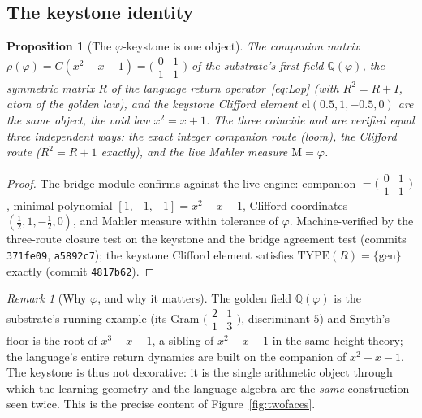 \documentclass[11pt]{article}
\theoremstyle{plain}
\newtheorem{proposition}[theorem]{Proposition}
\theoremstyle{definition}
\theoremstyle{remark}
\newtheorem{remark}[theorem]{Remark}
\newcommand{\Q}{\mathbb{Q}}
\newcommand{\Mah}{\mathrm{M}}
\begin{document}
\subsection{The keystone identity}
\begin{proposition}[The $\varphi$-keystone is one object]\label{prop:keystone}
The companion matrix $\rho(\varphi)=C(x^2-x-1)=\big(\begin{smallmatrix}0&1\\1&1\end{smallmatrix}\big)$ of the
substrate's first field $\Q(\varphi)$, the symmetric matrix $R$ of the language return
operator~\eqref{eq:Lop} (with $R^2=R+I$, atom of the golden law), and the keystone Clifford element
$\mathrm{cl}(0.5,1,-0.5,0)$ are the \emph{same} object, the void law $x^2=x+1$. The three coincide and are
verified equal three independent ways: the exact integer companion route (loom), the Clifford route
($R^2=R+1$ exactly), and the live Mahler measure $\Mah=\varphi$.
\end{proposition}
\begin{proof}
The bridge module confirms against the live engine: companion $=\big(\begin{smallmatrix}0&1\\1&1\end{smallmatrix}\big)$,
minimal polynomial $[1,-1,-1]=x^2-x-1$, Clifford coordinates $(\tfrac12,1,-\tfrac12,0)$, and Mahler measure
within tolerance of $\varphi$. Machine-verified by the three-route closure test on the keystone and the bridge
agreement test (commits \texttt{371fe09}, \texttt{a5892c7}); the keystone Clifford element satisfies
$\mathrm{TYPE}(R)=\{\text{gen}\}$ exactly (commit \texttt{4817b62}).
\end{proof}

\begin{remark}[Why $\varphi$, and why it matters]\label{rem:whyphi}
The golden field $\Q(\varphi)$ is the substrate's running example (its Gram $\big(\begin{smallmatrix}2&1\\1&3\end{smallmatrix}\big)$,
discriminant $5$) and Smyth's floor is the root of $x^3-x-1$, a sibling of $x^2-x-1$ in the same height
theory; the language's entire return dynamics are built on the companion of $x^2-x-1$. The keystone is thus not
decorative: it is the single arithmetic object through which the learning geometry and the language algebra are
the \emph{same} construction seen twice. This is the precise content of Figure~\ref{fig:twofaces}.
\end{remark}
\end{document}

